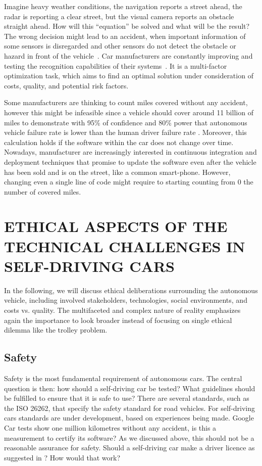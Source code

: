 Imagine heavy weather conditions, the navigation reports a street ahead, the radar is reporting a clear street, but the visual camera reports an obstacle straight ahead. How will this \enquote{equation} be solved and what will be the result? The wrong decision might lead to an accident, when important information of some sensors is disregarded and other sensors do not detect the obstacle or hazard in front of the vehicle~\cite{Tesla2016_tragicloss}. Car manufacturers are constantly improving and testing the recognition capabilities of their systems~\cite{Tesla2016_upgrade}. It is a multi-factor optimization task, which aims to find an optimal solution under consideration of costs, quality, and potential risk factors.

Some manufacturers are thinking to count miles covered without any accident, however this might be infeasible since a vehicle should cover around 11 billion of miles to demonstrate with 95\% of confidence and 80\% power that autonomous vehicle failure rate is lower than the human driver failure rate \cite{KALRA2016182}. Moreover, this calculation holds if the software within the car does not change over time. Nowadays, manufacturer are increasingly interested in continuous integration and deployment techniques that promise to update the software even after the vehicle has been sold and is on the street, like a common smart-phone. However, changing even a single line of code might require to starting counting from 0 the number of covered miles.


\section{ETHICAL ASPECTS OF THE TECHNICAL CHALLENGES IN SELF-DRIVING CARS}
\label{sec:EAofTC}

In the following, we will discuss ethical deliberations surrounding the autonomous vehicle, including involved stakeholders, technologies, social environments, and costs vs. quality. The multifaceted and complex nature of reality emphasizes again the importance to look broader instead of focusing on single ethical dilemma like the trolley problem.

\subsection{Safety}
\label{sec:EAofTC:Safety}

Safety is the most fundamental requirement of autonomous cars. The central question is then: how should a self-driving car be tested? What guidelines should be fulfilled to ensure that it is safe to use? There are several standards, such as the ISO 26262, that specify the safety standard for road vehicles. For self-driving cars standards are under development, based on experiences being made. 
Google Car tests show one million kilometres without any accident, is this a measurement to certify its software? As we discussed above, this should not be a reasonable assurance for safety. Should a self-driving car make a driver licence as suggested in \cite{McBride:2016:EDC:2874239.2874265}? How would that work? 

